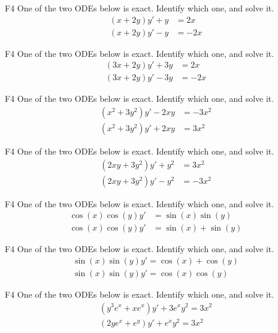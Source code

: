 

\begin{problem}{F4}
One of the two ODEs below is exact.  Identify which one, and solve it.
\begin{align*}
 (x + 2y)y'+y &=2x \\ %
 (x + 2y)y'-y &=-2x  
\end{align*}
\end{problem}

\begin{problem}{F4}
One of the two ODEs below is exact.  Identify which one, and solve it.
\begin{align*}
(3x + 2y)y'+3y &= 2x \\ %
(3x + 2y)y'-3y &= -2x  
\end{align*}
\end{problem}

\begin{problem}{F4}
One of the two ODEs below is exact.  Identify which one, and solve it.
\begin{align*}
(x^2 + 3y^2)y' -2xy &= -3x^2 \\
(x^2 + 3y^2)y' +2xy &= 3x^2  %
\end{align*}
\end{problem}

\begin{problem}{F4}
One of the two ODEs below is exact.  Identify which one, and solve it.
\begin{align*}
(2xy + 3y^2)y' +y^2 &= 3x^2\\ %
(2xy + 3y^2)y' -y^2 &= -3x^2
\end{align*}
\end{problem}

\begin{problem}{F4}
One of the two ODEs below is exact.  Identify which one, and solve it.
\begin{align*}
\cos(x)\cos(y)y' &= \sin(x)\sin(y) \\ %
\cos(x)\cos(y)y' &= \sin(x)+\sin(y)
\end{align*}
\end{problem}

\begin{problem}{F4}
One of the two ODEs below is exact.  Identify which one, and solve it.
\begin{align*}
\sin(x)\sin(y)y' = \cos(x)+\cos(y) \\
\sin(x)\sin(y)y' = \cos(x)\cos(y)  %
\end{align*}
\end{problem}

\begin{problem}{F4}
One of the two ODEs below is exact.  Identify which one, and solve it.
\begin{align*}
(y^3e^x+xe^x)y' +3e^xy^2 = 3x^2\\
(2ye^x+e^y)y' +e^xy^2 = 3x^2 %
\end{align*}
\end{problem}


